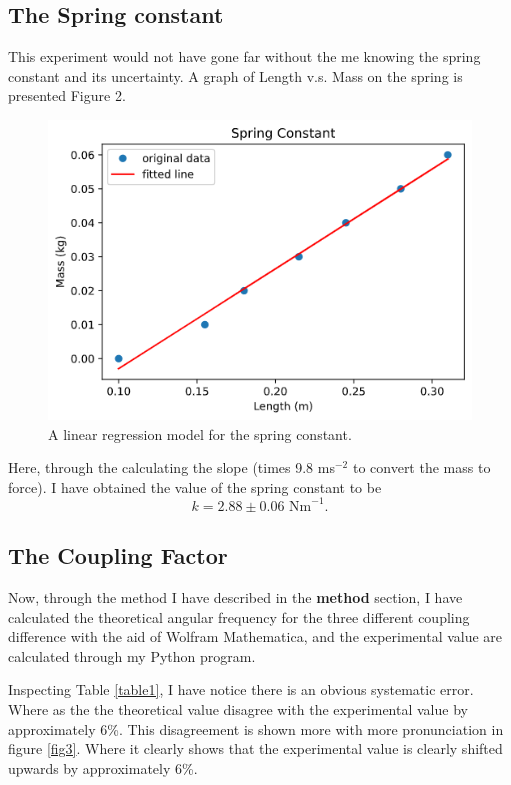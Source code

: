 \documentclass[aps,prl,reprint,10pt,amsmath,amssymb,superscriptaddress,a4paper]{revtex4-2}
\begin{document}
\subsection{The Spring constant}
This experiment would not have gone far without the me knowing the spring constant and its uncertainty. A graph of Length v.s. Mass on the spring is presented Figure 2. 
\begin{figure}[H]
    \includegraphics[width = 9 cm]{images/SpringConstant.png}
    \caption{A linear regression model for the spring constant. \label{fig 2}}
\end{figure}

Here, through the calculating the slope (times 9.8 ms$^{-2}$ to convert the mass to force). I have obtained the value of the spring constant to be 
\[
    k = 2.88 \pm 0.06 \text{ Nm}^{-1}.  
\]

\subsection{The Coupling Factor}
Now, through the method I have described in the \textbf{method} section, I have calculated the theoretical angular frequency for the three different coupling difference with the aid of Wolfram Mathematica\cite{math}, and the experimental value are calculated through my Python program. 

Inspecting Table \ref{table1}, I have notice there is an obvious systematic error. Where as the the theoretical value disagree with the experimental value by approximately 6\%. This disagreement is shown more with more pronunciation in figure \ref{fig3}. Where it clearly shows that the experimental value is clearly shifted upwards by approximately 6\%.
\end{document}
